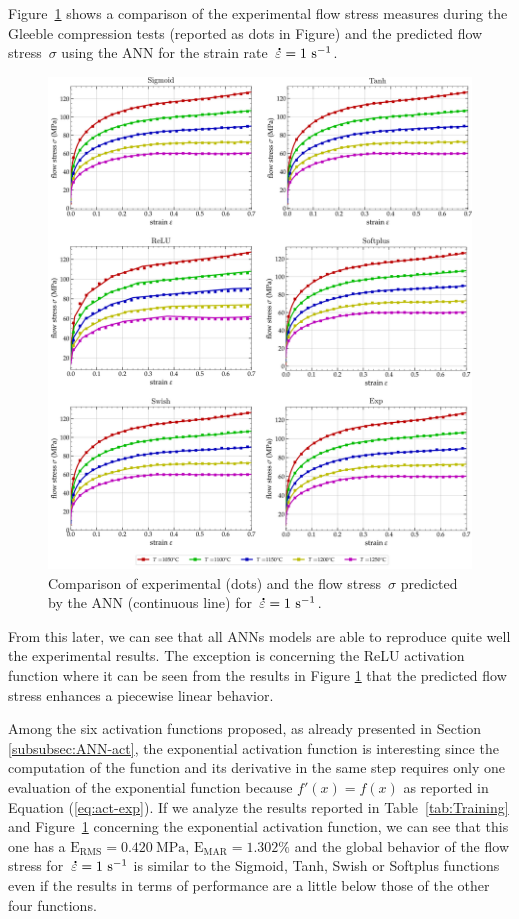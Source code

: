 \documentclass[algorithms,article,submit,pdftex,oneauthors]{Definitions/mdpi}
\DeclareRobustCommand{\mdot}[1]{\accentset{\mbox{\bfseries .}}{#1}}
\DeclareRobustCommand{\RMSE}{\text{E}_\text{RMS}}
\DeclareRobustCommand{\MARE}{\text{E}_\text{MAR}}
\DeclareRobustCommand{\ps}{\text{s}^{-1}}
\DeclareRobustCommand{\MPa}{\text{MPa}}
\begin{document}
Figure~\ref{fig:ANNFit} shows a comparison of the experimental flow stress measures during the Gleeble compression tests (reported as dots in Figure) and the predicted flow stress~$\sigma$ using the ANN for the strain rate~$\mdot{\varepsilon}=1~\ps$.
\begin{figure}[h]
\centering
\includegraphics[width=0.95\columnwidth]{Figures/ANN-fit}
\caption{Comparison of experimental (dots) and the flow stress~$\sigma$ predicted by the ANN (continuous line) for~$\mdot{\varepsilon}=1~\ps$.}
\label{fig:ANNFit}
\end{figure}
From this later, we can see that all ANNs models are able to reproduce quite well the experimental results.
The exception is concerning the ReLU activation function where it can be seen from the results in Figure \ref{fig:ANNFit} that the predicted flow stress enhances a piecewise linear behavior.

Among the six activation functions proposed, as already presented in Section \ref{subsubsec:ANN-act}, the exponential activation function is interesting since the computation of the function and its derivative in the same step requires only one evaluation of the exponential function because $f'(x)=f(x)$ as reported in Equation (\ref{eq:act-exp}).
If we analyze the results reported in Table~\ref{tab:Training} and Figure~\ref{fig:ANNFit} concerning the exponential activation function, we can see that this one has a $\RMSE=0.420~\MPa$, $\MARE=1.302\%$ and the global behavior of the flow stress for~$\mdot{\varepsilon}=1~\ps$ is similar to the Sigmoid, Tanh, Swish or Softplus functions even if the results in terms of performance are a little below those of the other four functions.
\end{document}
